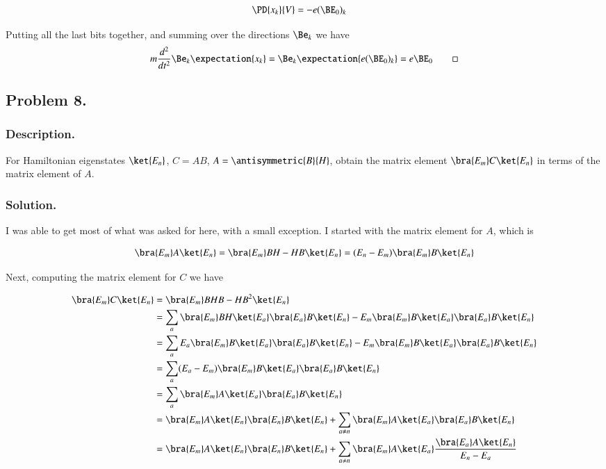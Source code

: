 \begin{align*}
\PD{x_k}{V} &= - e (\BE_0)_k
\end{align*}

Putting all the last bits together, and summing over the directions $\Be_k$ we have
\begin{align*}
m \frac{d^2}{dt^2} \Be_k \expectation{x_k} 
= \Be_k \expectation{ e (\BE_0)_k }
= e \BE_0
\qquad\square
\end{align*}

\subsection{Problem 8. }

\subsubsection{Description. }

For Hamiltonian eigenstates $\ket{E_n}$, $C = AB$, $A = \antisymmetric{B}{H}$, obtain the matrix element $\bra{E_m} C \ket{E_n}$ in terms of the matrix element of $A$.

\subsubsection{Solution. }

I was able to get most of what was asked for here, with a small exception.  I started with the matrix element for $A$, which is

\begin{align}\label{eqn:desaiCh3:800}
\bra{E_m} A \ket{E_n}
=
\bra{E_m} BH - HB \ket{E_n} 
=
(E_n - E_m)\bra{E_m} B \ket{E_n} 
\end{align}

Next, computing the matrix element for $C$ we have

\begin{align*}
\bra{E_m} C \ket{E_n}
&=
\bra{E_m} BHB - HB^2 \ket{E_n} \\
&=
\sum_a \bra{E_m} BH \ket{E_a}\bra{E_a} B \ket{E_n} - E_m \bra{E_m} B \ket{E_a} \bra{E_a} B \ket{E_n} \\
&=
\sum_a E_a \bra{E_m} B \ket{E_a}\bra{E_a} B \ket{E_n} -E_m \bra{E_m} B \ket{E_a} \bra{E_a} B \ket{E_n} \\
&=
\sum_a (E_a - E_m)\bra{E_m} B \ket{E_a}\bra{E_a} B \ket{E_n} \\
&=
\sum_a \bra{E_m} A \ket{E_a} \bra{E_a} B \ket{E_n} \\
&=
\bra{E_m} A \ket{E_n} \bra{E_n} B \ket{E_n} 
+\sum_{a \ne n} \bra{E_m} A \ket{E_a} \bra{E_a} B \ket{E_n} \\
&=
\bra{E_m} A \ket{E_n} 
\bra{E_n} B \ket{E_n} 
+\sum_{a \ne n} \bra{E_m} A \ket{E_a} 
\frac{\bra{E_a} A \ket{E_n}}{E_n - E_a}
\end{align*}

